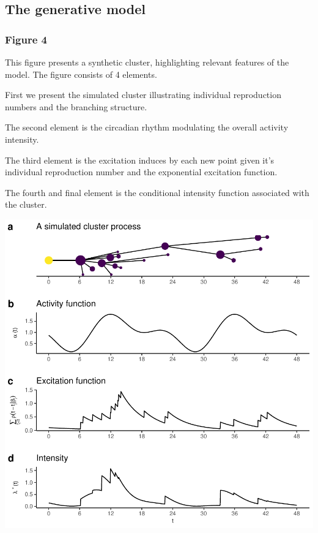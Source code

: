 \documentclass[
]{article}
\begin{document}
\hypertarget{the-generative-model}{%
\subsection{The generative model}\label{the-generative-model}}

\hypertarget{figure-4}{%
\subsubsection{Figure 4}\label{figure-4}}

This figure presents a synthetic cluster, highlighting relevant features
of the model. The figure consists of 4 elements.

First we present the simulated cluster illustrating individual
reproduction numbers and the branching structure.

The second element is the circadian rhythm modulating the overall
activity intensity.

The third element is the excitation induces by each new point given it's
individual reproduction number and the exponential excitation function.

The fourth and final element is the conditional intensity function
associated with the cluster.

\includegraphics{figures_and_tables_files/figure-latex/model_form-1.pdf}
\end{document}
